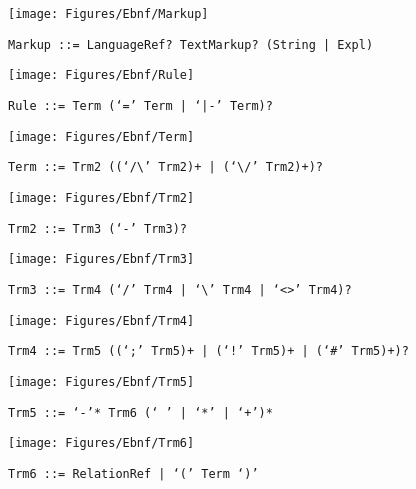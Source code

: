  \begin{figure}[H]
  \centering
  \texttt{[image: Figures/Ebnf/Markup]}
  \caption*{\texttt{Markup \small::=  LanguageRef? TextMarkup? (String | Expl)}}
  \label{fig:ebnf-Markup}
 \end{figure}

 \begin{figure}[H]
  \centering
  \texttt{[image: Figures/Ebnf/Rule]}
  \caption*{\texttt{Rule \small::=  Term (`=' Term | `|-' Term)?}}
  \label{fig:ebnf-Rule}
 \end{figure}

 \begin{figure}[H]
  \centering
  \texttt{[image: Figures/Ebnf/Term]}
  \caption*{\texttt{Term \small::=  Trm2 ((`/\textbackslash{}' Trm2)+ | (`\textbackslash{}/' Trm2)+)?}}
  \label{fig:ebnf-Term}
 \end{figure}

 \begin{figure}[H]
  \centering
  \texttt{[image: Figures/Ebnf/Trm2]}
  \caption*{\texttt{Trm2 \small::=  Trm3 (`-' Trm3)?}}
  \label{fig:ebnf-Trm2}
 \end{figure}

 \begin{figure}[H]
  \centering
  \texttt{[image: Figures/Ebnf/Trm3]}
  \caption*{\texttt{Trm3 \small::=  Trm4 (`/' Trm4 | `\textbackslash{}' Trm4 | `<>' Trm4)?}}
  \label{fig:ebnf-Trm3}
 \end{figure}

 \begin{figure}[H]
  \centering
  \texttt{[image: Figures/Ebnf/Trm4]}
  \caption*{\texttt{Trm4 \small::=  Trm5 ((`;' Trm5)+ | (`!' Trm5)+ | (`\#' Trm5)+)?}}
  \label{fig:ebnf-Trm4}
 \end{figure}

 \begin{figure}[H]
  \centering
  \texttt{[image: Figures/Ebnf/Trm5]}
  \caption*{\texttt{Trm5 \small::=  `-'* Trm6 (`~' | `*' | `+')*}}
  \label{fig:ebnf-Trm5}
 \end{figure}

 \begin{figure}[H]
  \centering
  \texttt{[image: Figures/Ebnf/Trm6]}
  \caption*{\texttt{Trm6 \small::=  RelationRef | `(' Term `)'}}
  \label{fig:ebnf-Trm6}
 \end{figure}

